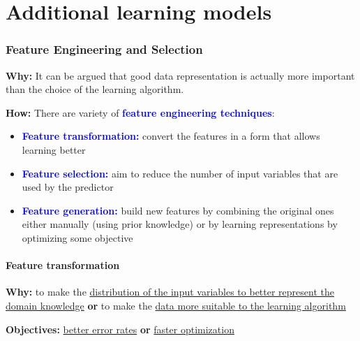 \documentclass[12pt, a4paper]{article}
\let\stdsection\section
\renewcommand\section{\newpage\stdsection} %
\begin{document}
  \part{Additional learning models}
  \newpage









\section{Feature Engineering and Selection}\label{feature-engineering-and-selection}

\textbf{Why:} It can be argued that good data representation is actually more important than the choice of the learning algorithm.

\textbf{How:} There are variety of \textbf{\textcolor{blue}{feature engineering techniques}}:

\begin{itemize}
  \item \textbf{\textcolor{blue}{Feature transformation:}} convert the features in a form that allows learning better
  \item \textbf{\textcolor{blue}{Feature selection:}} aim to reduce the number of input variables that are used by the predictor
  \item \textbf{\textcolor{blue}{Feature generation:}} build new features by combining the original ones either manually (using prior knowledge) or by learning representations by optimizing some objective
\end{itemize}

\subsection{Feature transformation}\label{feature-transformation}

\textbf{Why:} to make the \uline{distribution of the input variables to better represent the domain knowledge} \textbf{or} to make the \uline{data more suitable to the learning algorithm}

\textbf{Objectives:} \uline{better error rates} \textbf{or} \uline{faster optimization}
\end{document}
